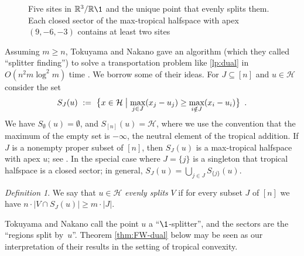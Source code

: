 \documentclass[a4paper,12pt]{amsart}
\newcommand\RR{{\mathbb R}}
\newcommand\cH{{\mathcal H}}
\newcommand\bigSetOf[2]{\bigl\{#1 \bigm| #2\bigr\}}
\newcommand\torus[1]{\RR^{#1}/\RR\1} %
\theoremstyle{remark}
\newtheorem{definition}[theorem]{Definition}
\begin{document}
\begin{figure}[th]
  \centering
	
  \caption{Five sites in $\torus{3}$ and the unique point that evenly splits them.
    Each closed sector of the max-tropical halfspace with apex $(9,-6,-3)$ contains at least two sites}
  \label{fig:evenSplit}
\end{figure}

Assuming $m\geq n$, Tokuyama and Nakano gave an algorithm (which they called \enquote{splitter finding}) to solve a transportation problem like \eqref{lp:dual} in $O(n^2m\log^2 m)$ time \cite[Theorem~3.1]{Tokuyama+Nakano:1995}.
We borrow some of their ideas.
For $J\subseteq[n]$ and $u\in\cH$ consider the set
\[ S_J(u) \ := \ \bigSetOf{x\in\cH}{\max_{j\in J}(x_j-u_j)\geq\max_{i\notin J}(x_i-u_i)} \enspace . \]
We have $S_\emptyset(u)=\emptyset$, and $S_{[n]}(u)=\cH$, where we use the convention that the maximum of the empty set is $-\infty$, the neutral element of the tropical addition.
If $J$ is a nonempty proper subset of $[n]$, then $S_J(u)$ is a max-tropical halfspace with apex $u$; see \cite[]{ETC}.
In the special case where $J=\{j\}$ is a singleton that tropical halfspace is a closed sector; in general, $S_J(u)=\bigcup_{j\in J}S_{\{j\}}(u)$.
\begin{definition}
  We say that $u\in\cH$ \emph{evenly splits} $V$ if for every subset $J$ of $[n]$ we have $n\cdot|V\cap S_J(u)|\geq m\cdot |J|$.
\end{definition}
Tokuyama and Nakano \cite{Tokuyama+Nakano:1995} call the point $u$ a \enquote{$\1$-splitter}, and the sectors are the \enquote{regions split by~$u$}.
Theorem \ref{thm:FW-dual} below may be seen as our interpretation of their results in the setting of tropical convexity.
\end{document}
